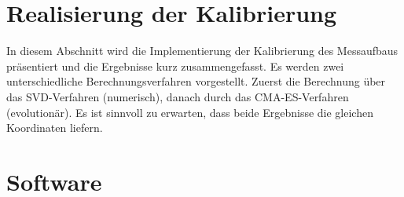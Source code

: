 \section{Realisierung der Kalibrierung}
\label{sec:calibration}
In diesem Abschnitt wird die Implementierung der Kalibrierung des Messaufbaus präsentiert und die Ergebnisse kurz zusammengefasst. Es werden zwei unterschiedliche Berechnungsverfahren vorgestellt. Zuerst die Berechnung über das SVD-Verfahren (numerisch), danach durch das CMA-ES-Verfahren (evolutionär). Es ist sinnvoll zu erwarten, dass beide Ergebnisse die gleichen Koordinaten liefern.
%

%
\section{Software}
\label{sec:sw}

